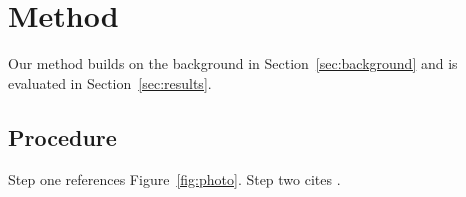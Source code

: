 \section{Method}
\label{sec:method}
Our method builds on the background in Section~\ref{sec:background} and is
evaluated in Section~\ref{sec:results}.

\subsection{Procedure}
\label{sub:procedure}
Step one references Figure~\ref{fig:photo}. Step two cites
\cite{mittelbach2004latex}.
